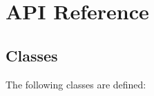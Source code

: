 %
%
%
%

\chapter{API Reference}
\label{api-reference}


\section{Classes}
The following classes are defined:

